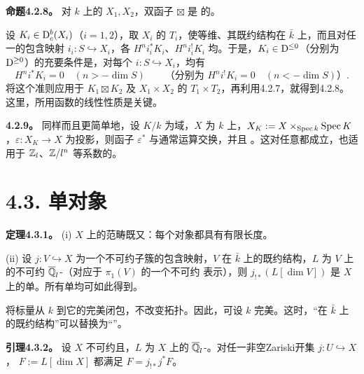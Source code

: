 \par\medskip\noindent\textbf{命题4.2.8。} 对 $k$ 上的 $X_1,X_2$，双函子 $\boxtimes$ 是 的。

设 $K_i\in\mathrm{D}_c^b(X_i)$（$i=1,2$），取 $X_i$ 的 $T_i$，使等维、其既约结构在 $\bar k$ 上，而且对任一的包含映射 $i_i:S\hookrightarrow X_i$，各 $H^ni_i^*K_i$、$H^ni_i^!K_i$ 均。于是，$K_i\in\mathrm{D}^{\le0}$（分别为 $\mathrm{D}^{\ge0}$）的充要条件是，对每个 $i:S\hookrightarrow X_i$，均有
\[H^ni^*K_i=0\quad(n>-\dim S)\qquad\text{（分别为 }H^ni^!K_i=0\quad(n<-\dim S)\text{）}.\]
将这个准则应用于 $K_1\boxtimes K_2$ 及 $X_1\times X_2$ 的 $T_1\times T_2$，再利用4.2.7，就得到4.2.8。这里，所用函数的线性性质是关键。

\par\medskip\noindent\textbf{4.2.9。} 同样而且更简单地，设 $K/k$ 为域，$X$ 为 $k$ 上，$X_K:=X\times_{\operatorname{Spec} k}\operatorname{Spec} K$，$\varepsilon:X_K\to X$ 为投影，则函子 $\varepsilon^*$ 与通常运算交换，并且 。这对任意都成立，也适用于 $\mathbb Z_l$、$\mathbb Z/l^n$ 等系数的。

\section*{4.3. 单对象}
\par\medskip\noindent\textbf{定理4.3.1。} (i) $X$ 上的范畴既又：每个对象都具有有限长度。

\noindent(ii) 设 $j:V\hookrightarrow X$ 为一个不可约子簇的包含映射，$V$ 在 $\bar k$ 上的既约结构，$L$ 为 $V$ 上的不可约 $\overline{\mathbb Q}_l$-（对应于 $\pi_1(V)$ 的一个不可约 表示），则 $j_{!*}(L[\dim V])$ 是 $X$ 上的单。所有单均可如此得到。

将标量从 $k$ 到它的完美闭包，不改变拓扑。因此，可设 $k$ 完美。这时，“在 $\bar k$ 上的既约结构”可以替换为“”。

\par\medskip\noindent\textbf{引理4.3.2。} 设 $X$ 不可约且，$L$ 为 $X$ 上的 $\overline{\mathbb Q}_l$-。对任一非空Zariski开集 $j:U\hookrightarrow X$， $F:=L[\dim X]$ 都满足 $F=j_{!*}j^*F$。

